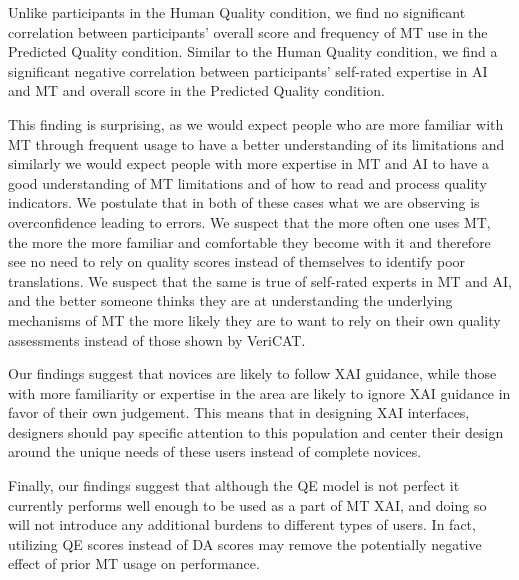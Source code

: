 Unlike participants in the Human Quality condition, we find no significant correlation between participants' overall score and frequency of MT use in the Predicted Quality condition. Similar to the Human Quality condition, we find a significant negative correlation between participants' self-rated expertise in AI and MT and overall score in the Predicted Quality condition.  

This finding is surprising, as we would expect people who are more familiar with MT through frequent usage to have a better understanding of its limitations and similarly we would expect people with more expertise in MT and AI to have a good understanding of MT limitations and of how to read and process quality indicators. We postulate that in both of these cases what we are observing is overconfidence leading to errors. We suspect that the more often one uses MT, the more the more familiar and comfortable they become with it and therefore see no need to rely on quality scores instead of themselves to identify poor translations. We suspect that the same is true of self-rated experts in MT and AI, and the better someone thinks they are at understanding the underlying mechanisms of MT the more likely they are to want to rely on their own quality assessments instead of those shown by VeriCAT.

Our findings suggest that novices are likely to follow XAI guidance, while those with more familiarity or expertise in the area are likely to ignore XAI guidance in favor of their own judgement. This means that in designing XAI interfaces, designers should pay specific attention to this population and center their design around the unique needs of these users instead of complete novices. 

Finally, our findings suggest that although the QE model is not perfect it currently performs well enough to be used as a part of MT XAI, and doing so will not introduce any additional burdens to different types of users. In fact, utilizing QE scores instead of DA scores may remove the potentially negative effect of prior MT usage on performance.  


